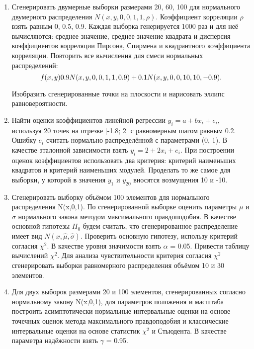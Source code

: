 \documentclass[12pt,a4paper]{scrartcl}
\begin{document}
\begin{enumerate}
\item 
Сгенерировать двумерные выборки размерами 20, 60, 100 для нормального двумерного распределения $N(x,y,0,0,1,1, \rho)$.
Коэффициент корреляции $\rho$ взять равным 0, 0.5, 0.9.
Каждая выборка генерируется 1000 раз и для неё вычисляются: среднее значение, среднее значение квадрата и дисперсия коэффициентов
корреляции Пирсона, Спирмена и квадрантного коэффициента корреляции.
Повторить все вычисления для смеси нормальных распределений:
\begin{equation}\label{eq:smes}
\centering
f(x, y) 0.9N(x, y, 0, 0, 1, 1, 0.9) + 0.1N(x, y, 0, 0, 10, 10, -0.9).
\end{equation}

Изобразить сгенерированные точки на плоскости и нарисовать эллипс
равновероятности.

\item

Найти оценки коэффициентов линейной регрессии $y_{i} = a + bx_{i} + e_{i}$, используя 20 точек на отрезке [-1.8; 2] с равномерным шагом равным 0.2. Ошибку $e_{i}$ считать нормально распределённой с параметрами (0, 1). В качестве эталонной зависимости взять $y_{i} = 2 + 2x_{i} + e_{i}$. При построении оценок коэффициентов использовать два критерия: критерий наименьших квадратов и критерий наименьших модулей. Проделать то же самое для выборки, у которой в значения $y_{1}$ и $y_{20}$ вносятся возмущения 10 и -10.

\item

 Сгенерировать выборку объёмом 100 элементов для нормального распределения N(x,0,1). По сгенерированной выборке оценить параметры $\mu$ и $\sigma$ нормального закона методом максимального правдоподобия. В качестве основной гипотезы $H_{0}$ будем считать, что сгенерированное распределение имеет вид $N(x,\hat{\mu}, \hat{\sigma})$. Проверить основную гипотезу, использу критерий согласия $\chi^{2}$. В качестве уровня значимости взять $\alpha$ = 0.05. Привести таблицу вычислений $\chi^{2}$. 
 \newline
Для анализа чувствительности критерия согласия $\chi^{2}$ сгенерировать выборки равномерного распределения объёмом 10 и 30 элементов.

\item

Для двух выборок размерами 20 и 100 элементов, сгенерированных согласно нормальному закону N(x,0,1), для параметров положения и масштаба построить асимптотически нормальные интервальные оценки на основе точечных оценок метода максимального правдоподобия и классические интервальные оценки на основе статистик $\chi^{2}$ и Стьюдента. В качестве параметра надёжности взять $\gamma$ = 0.95.

\end{enumerate}
\end{document}
